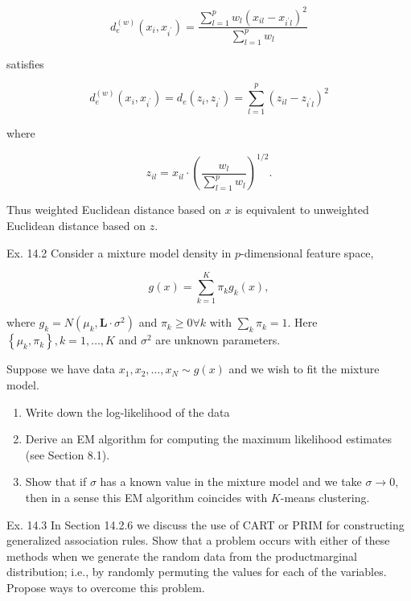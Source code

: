 \documentclass[10pt]{article}
\begin{document}
$$
d_{e}^{(w)}\left(x_{i}, x_{i^{\prime}}\right)=\frac{\sum_{l=1}^{p} w_{l}\left(x_{i l}-x_{i^{\prime} l}\right)^{2}}{\sum_{l=1}^{p} w_{l}}
$$

satisfies


\begin{equation*}
d_{e}^{(w)}\left(x_{i}, x_{i^{\prime}}\right)=d_{e}\left(z_{i}, z_{i^{\prime}}\right)=\sum_{l=1}^{p}\left(z_{i l}-z_{i^{\prime} l}\right)^{2} \tag{14.112}
\end{equation*}


where


\begin{equation*}
z_{i l}=x_{i l} \cdot\left(\frac{w_{l}}{\sum_{l=1}^{p} w_{l}}\right)^{1 / 2} . \tag{14.113}
\end{equation*}


Thus weighted Euclidean distance based on $x$ is equivalent to unweighted Euclidean distance based on $z$.

Ex. 14.2 Consider a mixture model density in $p$-dimensional feature space,


\begin{equation*}
g(x)=\sum_{k=1}^{K} \pi_{k} g_{k}(x), \tag{14.114}
\end{equation*}


where $g_{k}=N\left(\mu_{k}, \mathbf{L} \cdot \sigma^{2}\right)$ and $\pi_{k} \geq 0 \forall k$ with $\sum_{k} \pi_{k}=1$. Here $\left\{\mu_{k}, \pi_{k}\right\}, k= 1, \ldots, K$ and $\sigma^{2}$ are unknown parameters.

Suppose we have data $x_{1}, x_{2}, \ldots, x_{N} \sim g(x)$ and we wish to fit the mixture model.

\begin{enumerate}
  \item Write down the log-likelihood of the data
  \item Derive an EM algorithm for computing the maximum likelihood estimates (see Section 8.1).
  \item Show that if $\sigma$ has a known value in the mixture model and we take $\sigma \rightarrow 0$, then in a sense this EM algorithm coincides with $K$-means clustering.
\end{enumerate}

Ex. 14.3 In Section 14.2.6 we discuss the use of CART or PRIM for constructing generalized association rules. Show that a problem occurs with either of these methods when we generate the random data from the productmarginal distribution; i.e., by randomly permuting the values for each of the variables. Propose ways to overcome this problem.
\end{document}
